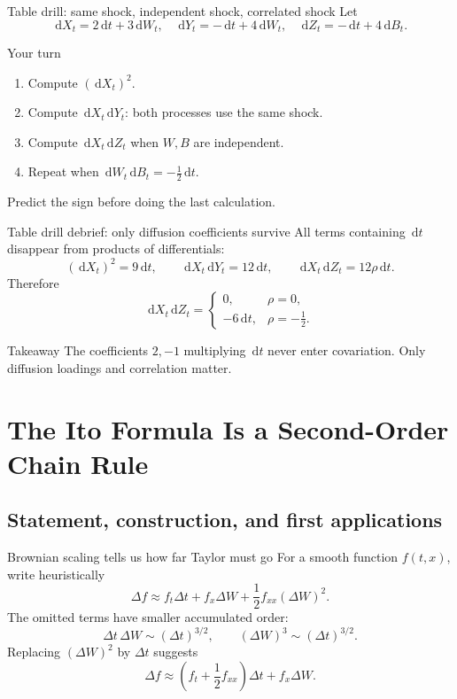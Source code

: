 \documentclass[handout,10pt,aspectratio=169]{beamer}
\newcommand{\dd}{\,\mathrm d}
\begin{document}
\begin{frame}{Table drill: same shock, independent shock, correlated shock}
Let
\[
\dd X_t=2\dd t+3\dd W_t,
\quad
\dd Y_t=-\dd t+4\dd W_t,
\quad
\dd Z_t=-\dd t+4\dd B_t.
\]
\begin{block}{Your turn}
\begin{enumerate}\setlength{\itemsep}{0.5em}
  \item Compute \((\dd X_t)^2\).
  \item Compute \(\dd X_t\dd Y_t\): both processes use the same shock.
  \item Compute \(\dd X_t\dd Z_t\) when \(W,B\) are independent.
  \item Repeat when \(\dd W_t\dd B_t=-\tfrac12\dd t\).
\end{enumerate}
\end{block}
Predict the sign before doing the last calculation.
\end{frame}

\begin{frame}{Table drill debrief: only diffusion coefficients survive}
All terms containing \(\dd t\) disappear from products of differentials:
\[
\boxed{
(\dd X_t)^2=9\dd t,
\qquad
\dd X_t\dd Y_t=12\dd t,
\qquad
\dd X_t\dd Z_t=12\rho\dd t.}
\]
Therefore
\[
\dd X_t\dd Z_t=
\begin{cases}
0, & \rho=0,\\
-6\dd t, & \rho=-\tfrac12.
\end{cases}
\]
\begin{block}{Takeaway}
The coefficients \(2,-1\) multiplying \(\dd t\) never enter covariation. Only diffusion loadings and correlation matter.
\end{block}
\end{frame}

\section{The Ito Formula Is a Second-Order Chain Rule}
\subsection{Statement, construction, and first applications}

\begin{frame}{Brownian scaling tells us how far Taylor must go}
For a smooth function \(f(t,x)\), write heuristically
\[
\Delta f
\approx f_t\Delta t+f_x\Delta W
+\frac12f_{xx}(\Delta W)^2.
\]
The omitted terms have smaller accumulated order:
\[
\Delta t\,\Delta W\sim(\Delta t)^{3/2},
\qquad
(\Delta W)^3\sim(\Delta t)^{3/2}.
\]
Replacing \((\Delta W)^2\) by \(\Delta t\) suggests
\[
\Delta f\approx
\left(f_t+\frac12f_{xx}\right)\Delta t+f_x\Delta W.
\]
\end{frame}
\end{document}
